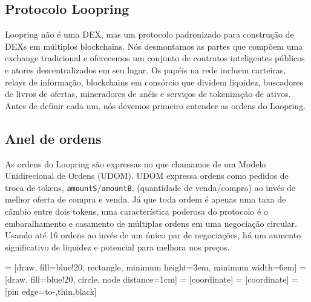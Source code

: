 \documentclass[UTF8,nofonts]{article}
\makeatletter
\newenvironment{figurehere}
 {\def\@captype{figure}}
 {}
\makeatother
\begin{document}
\begin{multicols}{2}
\section{Protocolo Loopring\label{sec:loopring_protocol}}
Loopring não é uma DEX, mas um protocolo padronizado para construção de DEXs em múltiplos blockchains. Nós desmontamos as partes que compõem uma exchange tradicional e oferecemos um conjunto de contratos inteligentes públicos e atores descentralizados em seu lugar.  Os papéis na rede incluem carteiras, relays de informação, blockchains em consórcio que dividem liquidez, buscadores de livros de ofertas, mineradores de anéis e serviços de tokenização de ativos. Antes de definir cada um, nós devemos primeiro entender as ordens do Loopring.

\subsection{Anel de ordens\label{sec:order_ring}}
As ordens do Loopring são expressas no que chamamos de um Modelo Unidirecional de Ordens (UDOM)\cite{coinport2014udom}. UDOM expressa ordens como pedidos de troca de tokens, \verb|amountS|/\verb|amountB|, (quantidade de venda/compra) ao invés de melhor oferta de compra e venda. Já que toda ordem é apenas uma taxa de câmbio entre dois tokens, uma característica poderosa do protocolo é o embaralhamento e casamento de múltiplas ordens em uma negociação circular. Usando até 16 ordens ao invés de um único par de negociações, há um aumento significativo de liquidez e potencial para melhora nos preços.

\begin{center}
\begin{figurehere}
\centering
{} = [draw, fill=blue!20, rectangle, 
    minimum height=3em, minimum width=6em]
 = [draw, fill=blue!20, circle, node distance=1cm]
 = [coordinate]
 = [coordinate]
 = [pin edge={to-,thin,black}]

\end{figurehere}
\end{center}
\end{multicols}
\end{document}
